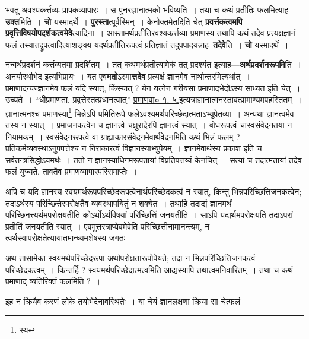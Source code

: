 \documentclass[article,12pt,a4paper]{memoir}
\begin{document}
	  \pstart भवतु अवश्यकर्त्तव्यः प्रापकव्यापारः । स पुनरज्ञानात्मको भविष्यति । तथा च कथं प्रतीतिः फलमित्याह \textbf{उक्त}मिति । \textbf{चो} यस्मादर्थे । \textbf{पुरस्ता}त्पूर्वस्मिन् । केनोक्तमेतदिति चेत् \textbf{प्रवर्त्तकत्वमपि प्रवृत्तिविषयोपदर्शकत्वमेवे}त्यादिना । आस्तामर्थप्रतीतिरवश्यकर्त्तव्या प्रमाणस्य तथापि कथं तदेव प्रत्यक्षज्ञानं फलं तस्यातद्रूपत्वादित्याशङ्क्य यदर्थप्रतीतिरूपत्वं प्रतिज्ञातं तदुपपादयन्नाह--\textbf{तदेवे}ति । \textbf{चो} यस्मादर्थे ।
	\pend
      

	  \pstart नन्वर्थप्रदर्शनं कर्त्तव्यतया प्रदर्शितम् । तत् कथमर्थप्रतीत्यामेकं तत् प्रदर्श्यत इत्याह—\textbf{अर्थप्रदर्शनरूपमि}ति । अनयोरर्थाभेद इत्यभिप्रायः । यत एव\textbf{मतो}ऽस्मा\textbf{त्तदेव} प्रत्यक्षं ज्ञानमेव नार्थान्तरमित्यर्थात् । प्रमाणादन्यज्ज्ञानमेव फलं यदि स्यात्, किंस्यात् ? येन यत्नेन गरीयसा प्रमाणादभेदोऽस्य साध्यत इति चेत् । उच्यते । “धीप्रमाणता, प्रवृत्तेस्तत्प्रधानत्वात्” \href{http://http://sarit.indology.info/?cref=pv.1.5}{प्रमाणवा०
	    १. ५.}इत्यत्राज्ञानात्मनस्तावत्प्रामाण्यमपहस्तितम् । ज्ञानात्मनश्च प्रमाणस्या\footnote{स्य} भिन्नेऽपि प्रमितिरूपे फलेऽवश्यमर्थपरिच्छेदात्मताऽभ्युपेतव्या । अन्यथा ज्ञानत्वमेव तस्य न स्यात् । प्रमाजनकत्वेन च ज्ञानत्वे चक्षुरादेरपि ज्ञानत्वं स्यात् । बोधरूपत्वं चास्वसंवेदनतया न नियामकम् । स्वसंवेदनरूपत्वे वा ग्राह्याकारसंवेदनमेवार्थवेदनमिति कथं भिन्नं फलम् ? प्रतिकर्मव्यवस्थाऽनुपपत्तेश्च न निराकारत्वं विज्ञानस्याभ्युपेयम् । ज्ञानमेवार्थस्य प्रकाश इति च सर्वतन्त्रसिद्धोऽयमर्थः । ततो न ज्ञानस्याधिगमरूपतायां विप्रतिपत्तव्यं केनचित् । सत्यां च तदात्मतायां तदेव फलं युज्यते, तावतैव प्रमाणव्यापारपरिसमाप्तेः ।
	\pend
      

	  \pstart अपि च यदि ज्ञानस्य स्वयमर्थरूपपरिच्छेदरूपत्वेनार्थपरिच्छेदकत्वं न स्यात्, किन्तु भिन्नपरिच्छित्तिजनकत्वेन; तदाऽर्थस्य परिच्छित्तेरपरोक्षतैव व्यवस्थापयितुं न शक्येत । तथाहि तदाद्यं ज्ञानमर्थं परिच्छिनत्त्यर्थमपरोक्षयतीति कोऽर्थोऽर्थविषयां परिच्छित्तिं जनयतीति । साऽपि यद्यर्थमपरोक्षयति तदाऽपरां प्रतीतिं जनयतीति स्यात् । एवमुत्तरत्राप्येवमेवेति परिच्छित्तीनामानन्त्यम्, न त्वर्थस्यापरोक्षतेत्यायातमान्ध्यमशेषस्य जगतः ।
	\pend
      

	  \pstart अथ तासामेका स्वयमर्थपरिच्छेदरूपा अर्थापरोक्षतारूपोपेयते; तदा न भिन्नपरिच्छित्तिजनकत्वं परिच्छेदकत्वम् । किन्तर्हि ? स्वयमर्थपरिच्छेदात्मत्वमिति आद्यस्यापि तथात्वमनिवारितम् । तथा च कथं प्रमाणाद् व्यतिरिक्तं फलमिति ? ।
	\pend
      

	  \pstart इह न क्रियैव करणं लोके तयोर्भेदेनावस्थितेः । या चेयं ज्ञानलक्षणा क्रिया सा चेत्फलं
	\pend
	  \bigskip
	  \begingroup
	
\end{document}
